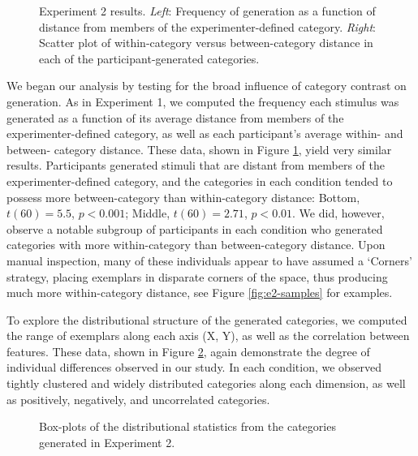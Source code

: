 \documentclass[12pt]{article}
\newcommand\inputpgf[2]{{
\let\pgfimageWithoutPath\pgfimage
\renewcommand{\pgfimage}[2][]{\pgfimageWithoutPath[##1]{#1/##2}}

}}
\begin{document}
\begin{flushleft}
\begin{figure}
    \begin{center}
    \inputpgf{figs/}{e2-distanceplots.pgf}
    \caption{Experiment 2 results. {\em Left}: Frequency of generation as a function of distance from members of the experimenter-defined category. {\em Right}: Scatter plot of within-category versus between-category distance in each of the participant-generated categories.}
    \label{fig:e2-distanceplots}
    \end{center}
\end{figure}

We began our analysis by testing for the broad influence of category contrast on generation. As in Experiment 1, we computed the frequency each stimulus was generated as a function of its average distance from members of the experimenter-defined category, as well as each participant's average within- and between- category distance. These data, shown in Figure \ref{fig:e2-distanceplots}, yield very similar results. Participants generated stimuli that are distant from members of the experimenter-defined category, and the categories in each condition tended to possess more between-category than within-category distance: Bottom, $t(60) = 5.5$, $p < 0.001$; Middle, $t(60) = 2.71$, $p < 0.01$. We did, however, observe a notable subgroup of participants in each condition who generated categories with more within-category than between-category distance. Upon manual inspection, many of these individuals appear to have assumed a `Corners' strategy, placing exemplars in disparate corners of the space, thus producing much more within-category distance, see Figure \ref{fig:e2-samples} for examples.

To explore the distributional structure of the generated categories, we computed the range of exemplars along each axis (X, Y), as well as the correlation between features. These data, shown in Figure \ref{fig:e2-statsboxes}, again demonstrate the degree of individual differences observed in our study. In each condition, we observed tightly clustered and widely distributed categories along each dimension, as well as positively, negatively, and uncorrelated categories. 

\begin{figure}
    \begin{center}
    \inputpgf{figs/}{e2-statsboxes.pgf}
    \caption{Box-plots of the distributional statistics from the categories generated in Experiment 2. }
    \label{fig:e2-statsboxes}
    \end{center}
\end{figure}



\end{flushleft}
\end{document}
